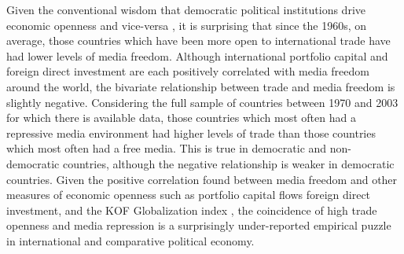 \documentclass[a4paper]{article}\usepackage[]{graphicx}\usepackage[]{color}
\begin{document}
Given the conventional wisdom that democratic political institutions drive economic openness \parencite{Milner:2005ci} and vice-versa \parencite{EICHENGREEN:2008gg}, it is surprising that since the 1960s, on average, those countries which have been more open to international trade have had lower levels of media freedom. Although international portfolio capital and foreign direct investment are each positively correlated with media freedom around the world, the bivariate relationship between trade and media freedom is slightly negative. Considering the full sample of countries between 1970 and 2003 for which there is available data, those countries which most often had a repressive media environment had higher levels of trade than those countries which most often had a free media. This is true in democratic and non-democratic countries, although the negative relationship is weaker in democratic countries. Given the positive correlation found between media freedom and other measures of economic openness such as portfolio capital flows foreign direct investment, and the KOF Globalization index \parencite{Dreher:2008dg}, the coincidence of high trade openness and media repression is a surprisingly under-reported empirical puzzle in international and comparative political economy.
\end{document}
